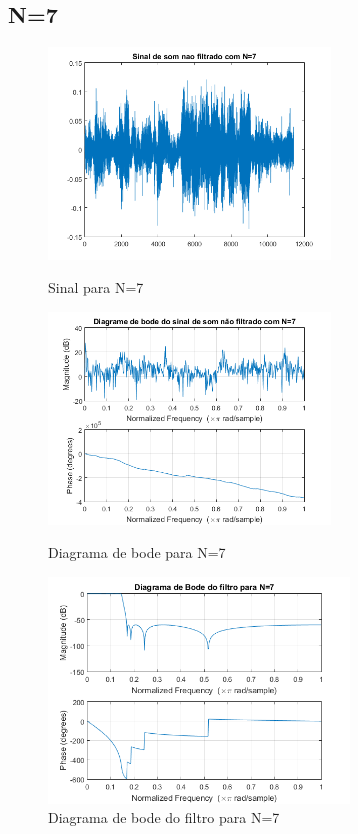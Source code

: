 \documentclass[11pt]{article}
\begin{document}
\subsection{N=7}
\begin{figure}[h]
\begin{center}
\begin{minipage}[b]{0.45\linewidth}
\includegraphics[width=7.5cm]{nfds7.png}
\caption{Sinal para N=7}
\label{figura8}
\end{minipage}
\begin{minipage}[b]{0.45\linewidth}
\includegraphics[width=7.5cm]{nfdb7.png}
\caption{Diagrama de bode para N=7}
\label{figura9}
\end{minipage}
\newline
\newline
\includegraphics[width=8cm]{filtro7.png}
\caption{Diagrama de bode do filtro para N=7}
\label{figura10}
\end{center}
\end{figure}
\end{document}
